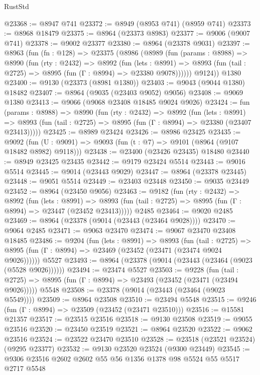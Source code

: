 \begin{lexlean}{RustStd}
\begin{coremodule}
@23368 := @8947 @741
@23372 := @8949 (@8953 @741) (@8959 @741)
@23373 := @8968 @18479
@23375 := @8964 (@23373 @8983)
@23377 := @9006 (@9007 @741)
@23378 := @9002 @23377
@23380 := @8964 (@23378 @9031)
@23397 := @8963
    (fun (fn : @128) =>
    @23375
      (@8986
        (@8989
          (fun (params : @8988) =>
          @8990
            (fun (rty : @2432) =>
            @8992
              (fun (lets : @8991) =>
              @8993 (fun (tail : @2725) => @8995 (fun (Γ : @8994) => @23380 @9078))))))
        @9124))
    @1380
@23400 := @9130 (@23373 (@8981 @1380))
@23403 := @9043 (@9044 @1380) @18482
@23407 := @8964 (@9035 (@23403 @9052) @9056)
@23408 := @9069 @1380
@23413 := @9066 (@9068 @23408 @18485 @9024 @9026)
@23424 := fun (params : @8988) =>
  @8990
    (fun (rty : @2432) =>
    @8992
      (fun (lets : @8991) =>
      @8993 (fun (tail : @2725) => @8995 (fun (Γ : @8994) => @23380 (@23407 @23413)))))
@23425 := @8989 @23424
@23426 := @8986 @23425
@23435 := @9092
    (fun (U : @9091) => @9093 (fun (t : @7) => @9101 (@8964 (@9107 @18482 @8982) @9118)))
@23438 := @23400 (@23426 @23435) @18480
@23440 := @8949 @23425 @23435
@23442 := @9179 @23424 @5514
@23443 := @9016 @5514
@23445 := @9014 (@23443 @9029)
@23447 := @8964 (@23378 @23445)
@23448 := @9051 @5514
@23449 := @23403 @23448
@23450 := @9035 @23449
@23452 := @8964 (@23450 @9056)
@23463 := @9182
    (fun (rty : @2432) =>
    @8992
      (fun (lets : @8991) =>
      @8993 (fun (tail : @2725) => @8995 (fun (Γ : @8994) => @23447 (@23452 @23413)))))
    @2485
@23464 := @9020 @2485
@23469 := @8964 (@23378 (@9014 (@23443 (@23464 @9028))))
@23470 := @9064 @2485
@23471 := @9063 @23470
@23474 := @9067 @23470 @23408 @18485
@23486 := @9204
    (fun (lets : @8991) =>
    @8993
      (fun (tail : @2725) =>
      @8995 (fun (Γ : @8994) => @23469 (@23452 (@23471 (@23474 @9024 @9026))))))
    @5527
@23493 := @8964 (@23378 (@9014 (@23443 (@23464 (@9023 (@5528 @9026))))))
@23494 := @23474 @5527
@23503 := @9228
    (fun (tail : @2725) => @8995 (fun (Γ : @8994) => @23493 (@23452 (@23471 (@23494 @9026)))))
    @5548
@23508 := @23378 (@9014 (@23443 (@23464 (@9023 @5549))))
@23509 := @8964 @23508
@23510 := @23494 @5548
@23515 := @9246 (fun (Γ : @8994) => @23509 (@23452 (@23471 @23510)))
@23516 := @15581 @21357
@23517 := @23515 @23516
@23518 := @9130 @23508
@23519 := @9055 @23516
@23520 := @23450 @23519
@23521 := @8964 @23520
@23522 := @9062 @23516
@23524 := @23522 @23470 @23510
@23528 := @23518 (@23521 @23524) (@9295 @23377)
@23532 := @9130 @23520 @23524 (@9300 @23449)
@23545 := @9306 @23516 @2602 @2602 @55 @56 @1356 @1378 @98 @5524 @55 @5517 @2717 @5548

\end{coremodule}
\end{lexlean}
